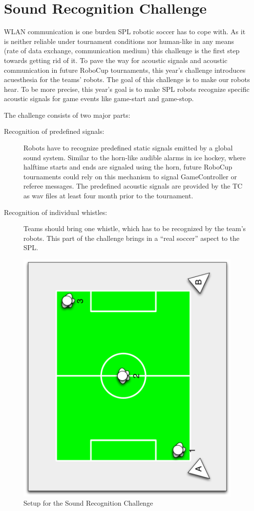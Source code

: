 \documentclass[12pt]{article}
\begin{document}
\section{Sound Recognition Challenge}

WLAN communication is one burden SPL robotic soccer has to cope with. As it is neither reliable under tournament conditions nor human-like in any means (rate of data exchange, communication medium) this challenge is the first step towards getting rid of it. To pave the way for acoustic signals and acoustic communication in future RoboCup tournaments, this year's challenge introduces acuesthesia for the teams' robots. The goal of this challenge is to make our robots hear. To be more precise, this year's goal is to make SPL robots recognize specific acoustic signals for game events like game-start and game-stop.

The challenge consists of two major parts:
\begin{description}
	\item[Recognition of predefined signals:]Robots have to recognize predefined static signals emitted by a global sound system. Similar to the horn-like audible alarms in ice hockey, where halftime starts and ends are signaled using the horn, future RoboCup tournaments could rely on this mechanism to signal GameController or referee messages. The predefined acoustic signals are provided by the TC as wav files at least four month prior to the tournament.
	
	\item[Recognition of individual whistles:]Teams should bring one whistle, which has to be recognized by the team's robots. This part of the challenge brings in a ``real soccer'' aspect to the SPL.
	
\end{description}

\begin{figure}[th!]
\centerline{\includegraphics[width=0.6\columnwidth,angle=270]{figures/acuesthesia}}
\caption{Setup for the Sound Recognition Challenge}
\label{fig:recognition_challenge}
\end{figure}
\end{document}
